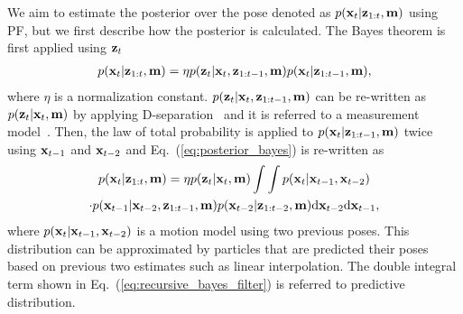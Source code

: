 \documentclass[letterpaper, 10 pt, conference]{ieeeconf}  %
\begin{document}
We aim to estimate the posterior over the pose denoted as $p({\bf x}_{t} | {\bf z}_{1:t}, {\bf m})$ using PF, but we first describe how the posterior is calculated.
The Bayes theorem is first applied using ${\bf z}_{t}$
%
\begin{align}
    p({\bf x}_{t} | {\bf z}_{1:t}, {\bf m}) = \eta p({\bf z}_{t} | {\bf x}_{t}, {\bf z}_{1:t-1}, {\bf m}) p({\bf x}_{t} | {\bf z}_{1:t-1}, {\bf m}),
    \label{eq:posterior_bayes}
\end{align}
%
where $\eta$ is a normalization constant.
$p({\bf z}_{t} | {\bf x}_{t}, {\bf z}_{1:t-1}, {\bf m})$ can be re-written as $p({\bf z}_{t} | {\bf x}_{t}, {\bf m})$ by applying D-separation~\cite{Bishop:2006:PRM:1162264} and it is referred to a measurement model~\cite{Thrun:2005:PR:1121596}.
Then, the law of total probability is applied to $p({\bf x}_{t} | {\bf z}_{1:t-1}, {\bf m})$ twice using ${\bf x}_{t-1}$ and ${\bf x}_{t-2}$ and Eq.~(\ref{eq:posterior_bayes}) is re-written as
%
\begin{align}
    \begin{gathered}
        p({\bf x}_{t} | {\bf z}_{1:t}, {\bf m}) = \eta p({\bf z}_{t} | {\bf x}_{t}, {\bf m}) \int \int p({\bf x}_{t} | {\bf x}_{t-1}, {\bf x}_{t-2}) \\
        \cdot p({\bf x}_{t-1} | {\bf x}_{t-2}, {\bf z}_{1:t-1}, {\bf m}) p({\bf x}_{t-2} | {\bf z}_{1:t-2}, {\bf m}) {\rm d}{\bf x}_{t-2} {\rm d}{\bf x}_{t-1},
    \end{gathered}
    \label{eq:recursive_bayes_filter}
\end{align}
%
where $p({\bf x}_{t} | {\bf x}_{t-1}, {\bf x}_{t-2})$ is a motion model using two previous poses.
This distribution can be approximated by particles that are predicted their poses based on previous two estimates such as linear interpolation.
The double integral term shown in Eq.~(\ref{eq:recursive_bayes_filter}) is referred to predictive distribution.
\begin{comment}
If the prediction is not performed, our particle filter estimates the following distribution
%
\begin{align}
    p({\bf x}_{t} | {\bf z}_{1:t}, {\bf m}) = \eta p({\bf z}_{t} | {\bf x}_{t}, {\bf m}) \int p({\bf x}_{t} | {\bf x}_{t-1}) {\rm d}{\bf x}_{t-1}.
    \label{eq:recursive_bayes_filter_wo_prediction}
\end{align}
%
\end{comment}
\end{document}
